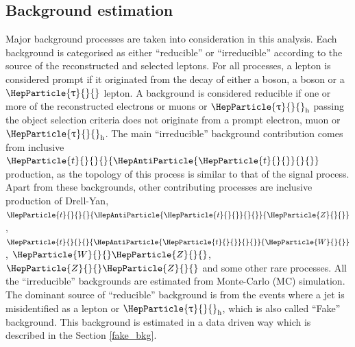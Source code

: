 \documentclass[12pt, a4paper]{article}
\DeclareRobustCommand{\PW}{{\HepParticle{W}{}{}}\xspace}
\DeclareRobustCommand{\PZ}{{\HepParticle{Z}{}{}}\xspace}
\DeclareRobustCommand{\PQt}{\HepParticle{t}{}{}} %
\DeclareRobustCommand{\PAQt}{{\HepAntiParticle{\PQt}{}{}}\xspace} %
\DeclareRobustCommand{\PGt}{{\HepParticle{\uptau}{}{}}\xspace} %
\newcommand{\ttbar}{\PQt{}\PAQt} %
\newcommand{\tauh}{\ensuremath{\PGt_\mathrm{h}}\xspace}
\begin{document}
\subsection{Background estimation}
Major background processes are taken into consideration in this analysis. Each background is categorised as either “reducible” or “irreducible” according to the source of the reconstructed and selected leptons. For all processes, a lepton is considered prompt if it originated from the decay of either a \PW boson, a \PZ boson or a $\PGt$ lepton. A background is considered reducible if one or more of the reconstructed electrons or muons or $\tauh$ passing the object selection criteria does not originate from a prompt electron, muon or $\tauh$. The main ``irreducible'' background contribution comes from inclusive $\ttbar$ production, as the topology of this process is similar to that of the signal process. Apart from these backgrounds, other contributing processes are inclusive production of Drell-Yan, $\ttbar\PZ$, $\ttbar\PW$, $\PW\PZ$, $\PZ\PZ$ and some other rare processes. All the ``irreducible'' backgrounds are estimated from Monte-Carlo (MC) simulation.\\
The dominant source of ``reducible'' background is from the events where a jet is misidentified as a lepton or $\tauh$, which is also called ``Fake'' background. This background is estimated in a data driven way which is described in the Section \ref{fake_bkg}.
\end{document}

